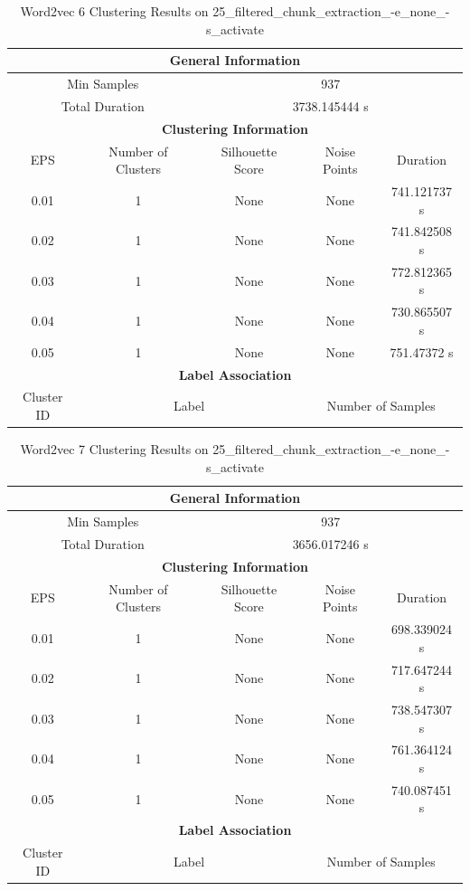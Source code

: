 \begin{longtable}{|c|c|c|c|c|}
\caption{Word2vec 6 Clustering Results on 25\_filtered\_chunk\_extraction\_-e\_none\_-s\_activate} \label{tab:25_filtered_chunk_extraction_-e_none_-s_activate_word2vec_6_clustering_results}\\
\hline
\multicolumn{5}{|c|}{\textbf{General Information}} \\
\hline
\multicolumn{2}{|c|}{Min Samples} & \multicolumn{3}{c|}{937} \\
\multicolumn{2}{|c|}{Total Duration} & \multicolumn{3}{c|}{3738.145444 s} \\
\hline
\multicolumn{5}{|c|}{\textbf{Clustering Information}} \\
\hline
EPS & Number of Clusters & Silhouette Score & Noise Points & Duration \\
0.01 & 1 & None & None & 741.121737 s\\
0.02 & 1 & None & None & 741.842508 s\\
0.03 & 1 & None & None & 772.812365 s\\
0.04 & 1 & None & None & 730.865507 s\\
0.05 & 1 & None & None & 751.47372 s\\
\hline
\multicolumn{5}{|c|}{\textbf{Label Association}} \\
\hline
Cluster ID & \multicolumn{2}{c|}{Label} & \multicolumn{2}{c|}{Number of Samples} \\
\hline
\end{longtable}


\begin{longtable}{|c|c|c|c|c|}
\caption{Word2vec 7 Clustering Results on 25\_filtered\_chunk\_extraction\_-e\_none\_-s\_activate} \label{tab:25_filtered_chunk_extraction_-e_none_-s_activate_word2vec_7_clustering_results}\\
\hline
\multicolumn{5}{|c|}{\textbf{General Information}} \\
\hline
\multicolumn{2}{|c|}{Min Samples} & \multicolumn{3}{c|}{937} \\
\multicolumn{2}{|c|}{Total Duration} & \multicolumn{3}{c|}{3656.017246 s} \\
\hline
\multicolumn{5}{|c|}{\textbf{Clustering Information}} \\
\hline
EPS & Number of Clusters & Silhouette Score & Noise Points & Duration \\
0.01 & 1 & None & None & 698.339024 s\\
0.02 & 1 & None & None & 717.647244 s\\
0.03 & 1 & None & None & 738.547307 s\\
0.04 & 1 & None & None & 761.364124 s\\
0.05 & 1 & None & None & 740.087451 s\\
\hline
\multicolumn{5}{|c|}{\textbf{Label Association}} \\
\hline
Cluster ID & \multicolumn{2}{c|}{Label} & \multicolumn{2}{c|}{Number of Samples} \\
\hline
\end{longtable}



